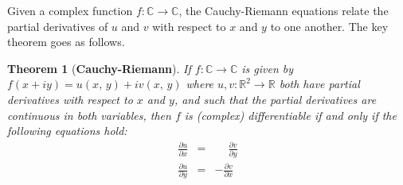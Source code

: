 \documentclass{article}
\newtheorem{theorem}{Theorem}[section]
\theoremstyle{definition}
\begin{document}
            Given a complex function $f:\mathbb{C}\rightarrow\mathbb{C}$,
            the Cauchy-Riemann equations relate the partial derivatives
            of $u$ and $v$ with respect to $x$ and $y$ to one another.
            The key theorem goes as follows.
            \begin{theorem}[\textbf{Cauchy-Riemann}]
                If $f:\mathbb{C}\rightarrow\mathbb{C}$ is given by
                $f(x+iy)=u(x,\,y)+iv(x,\,y)$ where
                $u,v:\mathbb{R}^{2}\rightarrow\mathbb{R}$ both have partial
                derivatives with respect to $x$ and $y$, and such that
                the partial derivatives are continuous in both variables,
                then $f$ is (complex) differentiable if and only if
                the following equations hold:
                \begin{equation}
                    \begin{array}{rcl}
                        \displaystyle
                        \frac{\partial{u}}{\partial{x}}
                        &=&
                        \displaystyle
                        \phantom{+}
                        \frac{\partial{v}}{\partial{y}}\\[2em]
                        \displaystyle
                        \frac{\partial{u}}{\partial{y}}
                        &=&
                        \displaystyle
                        -\frac{\partial{v}}{\partial{x}}
                    \end{array}
                \end{equation}
            \end{theorem}
\end{document}
